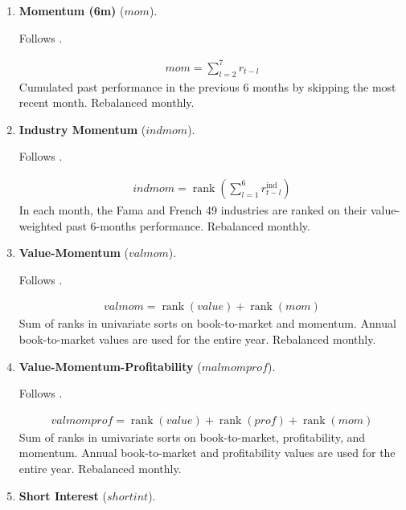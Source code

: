 \begin{enumerate}
	

	\item \textbf{Momentum (6m)} ($mom$). 
	
	Follows . 
	
	\begin{align*}
		mom = \sum_{l=2}^7 r_{t-l}
	\end{align*}
	Cumulated past performance in the previous 6 months by skipping the most recent month. Rebalanced monthly.
	
	
	
	\item \textbf{Industry Momentum} ($indmom$). 
	
	Follows . 
	
	\begin{align*}
		indmom = \operatorname{rank} \left( \sum_{l=1}^6 r_{t-l}^{\text{ind}} \right)
	\end{align*}
	In each month, the Fama and French 49 industries are ranked on their value-weighted past 6-months performance. Rebalanced monthly.
	
	
	
	\item \textbf{Value-Momentum} ($valmom$). 
	
	Follows . 
	
	\begin{align*}
		valmom =\operatorname{rank}(value) + \operatorname{rank}(mom)
	\end{align*}
	Sum of ranks in univariate sorts on book-to-market and momentum. Annual book-to-market values are used for the entire year. Rebalanced monthly.
	
	
	
	\item \textbf{Value-Momentum-Profitability} ($malmomprof$). 
	
	Follows . 
	
	\begin{align*}
		valmomprof =\operatorname{rank}(value) + \operatorname{rank}(prof) + \operatorname{rank}(mom)
	\end{align*}
	Sum of ranks in umivariate sorts on book-to-market, profitability, and momentum. Annual book-to-market and profitability values are used for the entire year. Rebalanced monthly.
	
	
	
	\item \textbf{Short Interest} ($shortint$). 
	

\end{enumerate}
